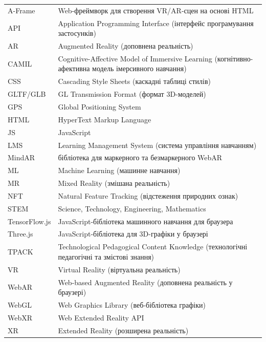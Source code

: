 \begin{longtable}{@{}p{}p{}@{}}
\addlinespace[6pt]
A-Frame  & Web-фреймворк для створення VR/AR-сцен на основі HTML \\
API      & Application Programming Interface (інтерфейс програмування застосунків) \\
AR       & Augmented Reality (доповнена реальність) \\
CAMIL    & Cognitive-Affective Model of Immersive Learning (когнітивно-афективна модель імерсивного навчання) \\
CSS      & Cascading Style Sheets (каскадні таблиці стилів) \\
GLTF/GLB & GL Transmission Format (формат 3D-моделей) \\
GPS      & Global Positioning System \\
HTML     & HyperText Markup Language \\
JS       & JavaScript \\
LMS      & Learning Management System (система управління навчанням) \\
MindAR   & бібліотека для маркерного та безмаркерного WebAR \\
ML       & Machine Learning (машинне навчання) \\
MR       & Mixed Reality (змішана реальність) \\
NFT      & Natural Feature Tracking (відстеження природних ознак) \\
STEM     & Science, Technology, Engineering, Mathematics \\
TensorFlow.js & JavaScript-бібліотека машинного навчання для браузера \\
Three.js & JavaScript-бібліотека для 3D-графіки у браузері \\
TPACK    & Technological Pedagogical Content Knowledge (технологічні педагогічні та змістові знання) \\
VR       & Virtual Reality (віртуальна реальність) \\
WebAR    & Web-based Augmented Reality (доповнена реальність у браузері) \\
WebGL    & Web Graphics Library (веб-бібліотека графіки) \\
WebXR    & Web Extended Reality API \\
XR       & Extended Reality (розширена реальність) \\

\end{longtable}
